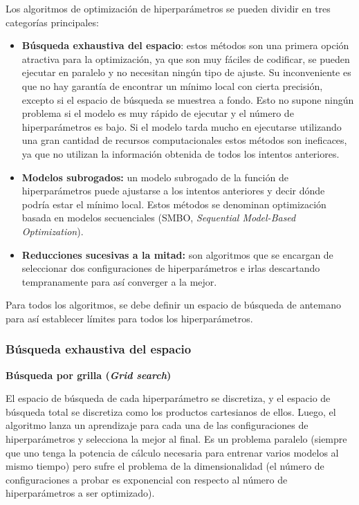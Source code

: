 \documentclass[a4paper,12pt]{article}
\begin{document}
Los algoritmos de optimización de hiperparámetros se pueden dividir en tres categorías principales:
\begin{itemize}[noitemsep, topsep=2pt]
	\item \textbf{Búsqueda exhaustiva del espacio}: estos métodos son una primera opción atractiva para la optimización, ya que son muy fáciles de codificar, se pueden ejecutar en paralelo y no necesitan ningún tipo de ajuste. Su inconveniente es que no hay garantía de encontrar un mínimo local con cierta precisión, excepto si el espacio de búsqueda se muestrea a fondo. Esto no supone ningún problema si el modelo es muy rápido de ejecutar y el número de hiperparámetros es bajo. Si el modelo tarda mucho en ejecutarse utilizando una gran cantidad de recursos computacionales estos métodos son ineficaces, ya que no utilizan la información obtenida de todos los intentos anteriores.
	\item \textbf{Modelos subrogados:} un modelo subrogado de la función de hiperparámetros puede ajustarse a los intentos anteriores y decir dónde podría estar el mínimo local. Estos métodos se denominan optimización basada en modelos secuenciales (SMBO, \textit{Sequential Model-Based Optimization}).
	\item \textbf{Reducciones sucesivas a la mitad:} son algoritmos que se encargan de seleccionar dos configuraciones de hiperparámetros e irlas descartando tempranamente para así converger a la mejor.
\end{itemize}

Para todos los algoritmos, se debe definir un espacio de búsqueda de antemano para así establecer límites para todos los hiperparámetros.

\subsubsection{Búsqueda exhaustiva del espacio}
\textbf{Búsqueda por grilla (\textit{Grid search})}

El espacio de búsqueda de cada hiperparámetro se discretiza, y el espacio de búsqueda total se discretiza como los productos cartesianos de ellos. Luego, el algoritmo lanza un aprendizaje para cada una de las configuraciones de hiperparámetros y selecciona la mejor al final. Es un problema paralelo (siempre que uno tenga la potencia de cálculo necesaria para entrenar varios modelos al mismo tiempo) pero sufre el problema de la dimensionalidad (el número de configuraciones a probar es exponencial con respecto al número de hiperparámetros a ser optimizado).
\end{document}
